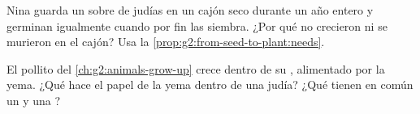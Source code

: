 \begin{exercise}[$\star\star$]\label{exo:g2:from-seed-to-plant:9}
Nina guarda un sobre de judías en un cajón seco durante un año entero
y germinan igualmente cuando por fin las siembra. ¿Por qué no
crecieron ni se murieron en el cajón? Usa la
\cref{prop:g2:from-seed-to-plant:needs}.
\end{exercise}

\begin{exercise}[$\star\star$]\label{exo:g2:from-seed-to-plant:10}
El pollito del \cref{ch:g2:animals-grow-up} crece dentro de su ,
alimentado por la yema. ¿Qué hace el papel de la yema dentro de una
judía? ¿Qué tienen en común un  y una ?
\end{exercise}
